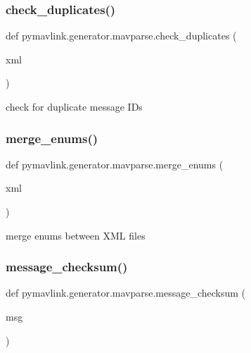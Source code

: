 \subsubsection{\texorpdfstring{check\+\_\+duplicates()}{check\_duplicates()}}
{\footnotesize\ttfamily def pymavlink.\+generator.\+mavparse.\+check\+\_\+duplicates (\begin{DoxyParamCaption}\item[{}]{xml }\end{DoxyParamCaption})}

\begin{DoxyVerb}check for duplicate message IDs\end{DoxyVerb}
 \mbox{\label{namespacepymavlink_1_1generator_1_1mavparse_a7547b5a23ef0b60fac86a3dae099723b}} 
\subsubsection{\texorpdfstring{merge\+\_\+enums()}{merge\_enums()}}
{\footnotesize\ttfamily def pymavlink.\+generator.\+mavparse.\+merge\+\_\+enums (\begin{DoxyParamCaption}\item[{}]{xml }\end{DoxyParamCaption})}

\begin{DoxyVerb}merge enums between XML files\end{DoxyVerb}
 \mbox{\label{namespacepymavlink_1_1generator_1_1mavparse_aba7d09994f850b5dce98eb0356318543}} 
\subsubsection{\texorpdfstring{message\+\_\+checksum()}{message\_checksum()}}
{\footnotesize\ttfamily def pymavlink.\+generator.\+mavparse.\+message\+\_\+checksum (\begin{DoxyParamCaption}\item[{}]{msg }\end{DoxyParamCaption})}

